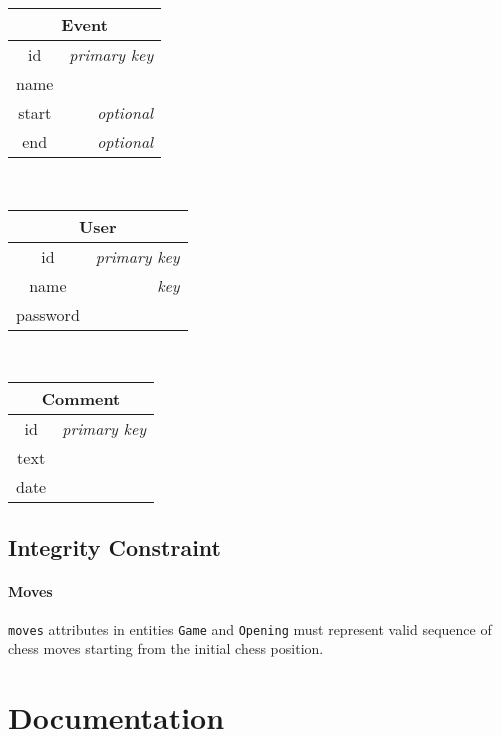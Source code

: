 \documentclass{article}
\begin{document}
\begin{table}[ht!]
    \begin{subtable}{3.5cm}
	\begin{tabular}[t]{|cr|}
	\hline
	\multicolumn{2}{|c|}{\textbf{Event}} \\
	\hline
	id     & \em{primary key} \\
	name   &                  \\
	start  & \em{optional}    \\
	end    & \em{optional}    \\
	\hline
	\end{tabular}
    \end{subtable}
    ~
    \begin{subtable}{4cm}
	\begin{tabular}[t]{|cr|}
	\hline
	\multicolumn{2}{|c|}{\textbf{User}} \\
	\hline
	id       & \em{primary key} \\
	name     & \em{key}         \\
	password &                  \\
	\hline
	\end{tabular}
    \end{subtable}
    ~
    \begin{subtable}{3.5cm}
	\begin{tabular}[t]{|cr|}
	\hline
	\multicolumn{2}{|c|}{\textbf{Comment}} \\
	\hline
	id     & \em{primary key} \\
	text   &                  \\
	date   &                  \\
	\hline
	\end{tabular}
    \end{subtable}
\end{table}


\subsection{Integrity Constraint}
\paragraph{Moves}
\verb|moves| attributes in entities \verb|Game| and \verb|Opening| must represent
valid sequence of chess moves starting from the initial chess position.


\section{Documentation}
\end{document}
